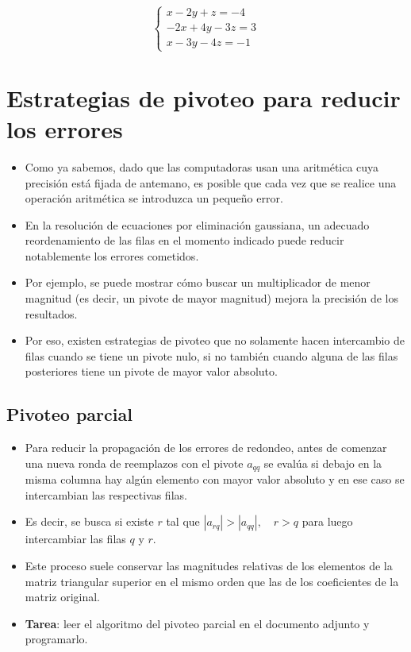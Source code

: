 \documentclass[openany]{book}
\providecommand{\tightlist}{%
  \setlength{\itemsep}{0pt}\setlength{\parskip}{0pt}}
\begin{document}
\[
\begin{cases} 
x-2y+z=-4 \\
-2x+4y-3z=3 \\
x-3y-4z=-1
\end{cases}
\]

\hypertarget{estrategias-de-pivoteo-para-reducir-los-errores}{%
\section{Estrategias de pivoteo para reducir los errores}\label{estrategias-de-pivoteo-para-reducir-los-errores}}

\begin{itemize}
\tightlist
\item
  Como ya sabemos, dado que las computadoras usan una aritmética cuya precisión está fijada de antemano, es posible que cada vez que se realice una operación aritmética se introduzca un pequeño error.
\item
  En la resolución de ecuaciones por eliminación gaussiana, un adecuado reordenamiento de las filas en el momento indicado puede reducir notablemente los errores cometidos.
\item
  Por ejemplo, se puede mostrar cómo buscar un multiplicador de menor magnitud (es decir, un pivote de mayor magnitud) mejora la precisión de los resultados.
\item
  Por eso, existen estrategias de pivoteo que no solamente hacen intercambio de filas cuando se tiene un pivote nulo, si no también cuando alguna de las filas posteriores tiene un pivote de mayor valor absoluto.
\end{itemize}

\hypertarget{pivoteo-parcial}{%
\subsection{Pivoteo parcial}\label{pivoteo-parcial}}

\begin{itemize}
\tightlist
\item
  Para reducir la propagación de los errores de redondeo, antes de comenzar una nueva ronda de reemplazos con el pivote \(a_{qq}\) se evalúa si debajo en la misma columna hay algún elemento con mayor valor absoluto y en ese caso se intercambian las respectivas filas.
\item
  Es decir, se busca si existe \(r\) tal que \(|a_{rq}| > |a_{qq}|,\quad r>q\) para luego intercambiar las filas \(q\) y \(r\).
\item
  Este proceso suele conservar las magnitudes relativas de los elementos de la matriz triangular superior en el mismo orden que las de los coeficientes de la matriz original.
\item
  \textbf{Tarea}: leer el algoritmo del pivoteo parcial en el documento adjunto y programarlo.
\end{itemize}
\end{document}
